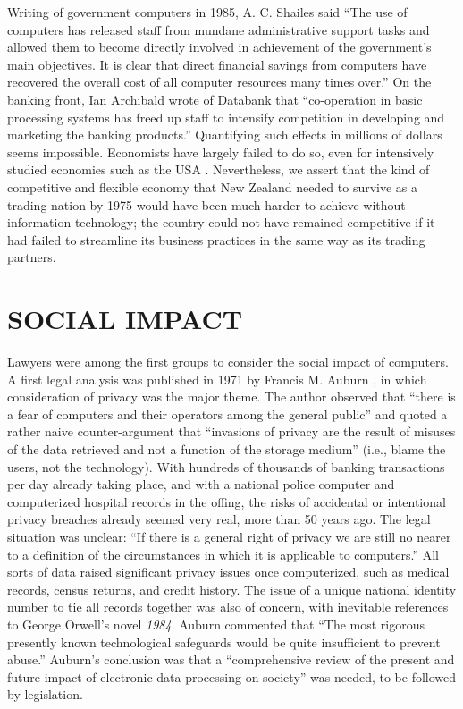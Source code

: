 \documentclass{IEEEcsmag}
\begin{document}
Writing of government computers in 1985, A. C. Shailes \cite{Shailes} said
“The use of computers has released staff from mundane administrative support tasks and
allowed them to become directly involved in achievement of the government’s main objectives.
It is clear that direct financial savings from computers have recovered the overall cost of all
computer resources many times over.” On the banking front, Ian Archibald \cite{Archibald} wrote
of Databank that “co-operation in basic processing systems has freed up staff to intensify competition
in developing and marketing the banking products.” Quantifying such effects in millions of dollars
seems impossible. Economists have largely failed to do so, even for intensively studied
economies such as the USA \cite{Oliner-1994}.
Nevertheless, we assert that the kind of competitive
and flexible economy that New Zealand needed to survive as a trading nation by 1975 would have been
much harder to achieve without information technology; the country could not have remained
competitive if it had failed to streamline its business practices in the same way as its trading partners.

\vspace*{-8pt}
\section{SOCIAL IMPACT}
Lawyers were among the first groups to consider the social impact of computers.
A first legal analysis was published in 1971 by Francis M. Auburn \cite{Auburn1971}, in which consideration of privacy
was the major theme. The author observed that “there is a fear of computers and their operators among the
general public” and quoted a rather naive counter-argument that “invasions of privacy are the result of misuses
of the data retrieved and not a function of the storage medium” (i.e., blame the users, not the technology).
With hundreds of thousands of banking transactions per day already taking place, and with a national police
computer and computerized hospital records in the offing, the risks of accidental or intentional privacy breaches
already seemed very real, more than 50 years ago. The legal situation was unclear: “If there is a general right of
privacy we are still no nearer to a definition of the circumstances in which it is applicable to computers.” All sorts
of data raised significant privacy issues once computerized, such as medical records, census returns, and credit history.
The issue of a unique national identity number to tie all records together was also of concern, with
inevitable references to George Orwell’s novel \textit{1984}. Auburn commented that “The most
rigorous presently known technological safeguards would be quite insufficient to
prevent abuse.” Auburn’s conclusion was that a “comprehensive review of the present and future
impact of electronic data processing on society” was needed, to be followed by legislation.
\end{document}
